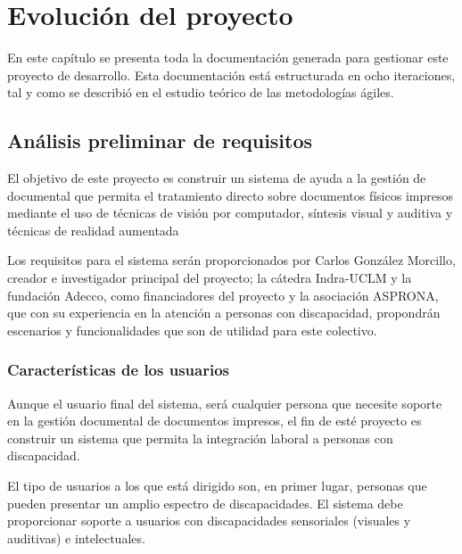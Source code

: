 \section{Evolución del proyecto}
En este capítulo se presenta toda la documentación generada para gestionar este proyecto de desarrollo. Esta documentación está estructurada en ocho iteraciones, tal y como se describió en el estudio teórico de las metodologías ágiles. 


\subsection{Análisis preliminar de requisitos}
El objetivo de este proyecto es construir un sistema de ayuda a la gestión de documental que permita el tratamiento directo sobre documentos físicos impresos mediante el
uso de técnicas de visión por computador, síntesis visual y auditiva y técnicas de realidad aumentada

Los requisitos para el sistema serán proporcionados por Carlos González Morcillo, creador e investigador principal del proyecto; la cátedra Indra-UCLM y la fundación Adecco, como financiadores del proyecto y la asociación ASPRONA, que con su experiencia en la atención a personas con discapacidad, propondrán escenarios y funcionalidades que son de utilidad para este colectivo. 

\subsubsection{Características de los usuarios}
Aunque el usuario final del sistema, será cualquier persona que necesite soporte en la gestión documental de documentos impresos, el fin de esté proyecto es construir un sistema que permita la integración laboral a personas con discapacidad. 

El tipo de usuarios a los que está dirigido son, en primer lugar, personas que pueden presentar un amplio espectro de discapacidades. El sistema debe proporcionar soporte a usuarios con discapacidades sensoriales (visuales y auditivas) e intelectuales.  

